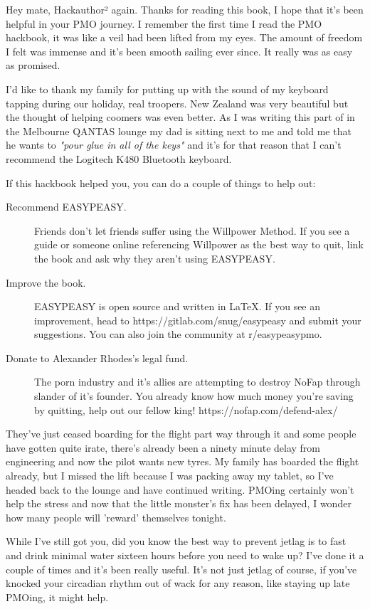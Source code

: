 \documentclass[easypeasy.tex]{subfiles}
\begin{document}
Hey mate, Hackauthor² again. Thanks for reading this book, I hope that it's been helpful in your PMO journey. I remember the first time I read the PMO hackbook, it was like a veil had been lifted from my eyes. The amount of freedom I felt was immense and it's been smooth sailing ever since. It really was as easy as promised.

I'd like to thank my family for putting up with the sound of my keyboard tapping during our holiday, real troopers. New Zealand was very beautiful but the thought of helping coomers was even better. As I was writing this part of in the Melbourne QANTAS lounge my dad is sitting next to me and told me that he wants to \textit{"pour glue in all of the keys"} and it's for that reason that I can't recommend the Logitech K480 Bluetooth keyboard.

If this hackbook helped you, you can do a couple of things to help out:
  \begin{description}
  \item [Recommend EASYPEASY.] Friends don't let friends suffer using the Willpower Method. If you see a guide or someone online referencing Willpower as the best way to quit, link the book and ask why they aren't using EASYPEASY.

  \item [Improve the book.] EASYPEASY is open source and written in LaTeX. If you see an improvement, head to https://gitlab.com/snug/easypeasy and submit your suggestions. You can also join the community at r/easypeasypmo.

  \item [Donate to Alexander Rhodes's legal fund.] The porn industry and it's allies are attempting to destroy NoFap through slander of it's founder. You already know how much money you're saving by quitting, help out our fellow king! https://nofap.com/defend-alex/
  \end{description}

They've just ceased boarding for the flight part way through it and some people have gotten quite irate, there's already been a ninety minute delay from engineering and now the pilot wants new tyres. My family has boarded the flight already, but I missed the lift because I was packing away my tablet, so I've headed back to the lounge and have continued writing. PMOing certainly won't help the stress and now that the little monster's fix has been delayed, I wonder how many people will 'reward' themselves tonight.

While I've still got you, did you know the best way to prevent jetlag is to fast and drink minimal water sixteen hours before you need to wake up? I've done it a couple of times and it's been really useful. It's not just jetlag of course, if you've knocked your circadian rhythm out of wack for any reason, like staying up late PMOing, it might help.
\end{document}
